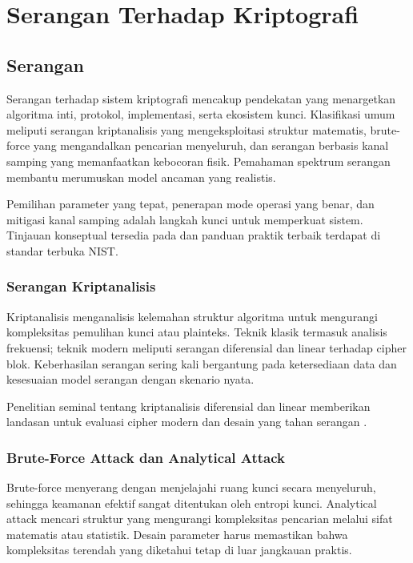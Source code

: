 \documentclass[../main.tex]{subfiles}
\begin{document}
\chapter{Serangan Terhadap Kriptografi}

\section{Serangan}
Serangan terhadap sistem kriptografi mencakup pendekatan yang menargetkan algoritma inti, protokol, implementasi, serta ekosistem kunci. Klasifikasi umum meliputi serangan kriptanalisis yang mengeksploitasi struktur matematis, brute-force yang mengandalkan pencarian menyeluruh, dan serangan berbasis kanal samping yang memanfaatkan kebocoran fisik. Pemahaman spektrum serangan membantu merumuskan model ancaman yang realistis.

Pemilihan parameter yang tepat, penerapan mode operasi yang benar, dan mitigasi kanal samping adalah langkah kunci untuk memperkuat sistem. Tinjauan konseptual tersedia pada \textcite{menezes1996handbook} dan panduan praktik terbaik terdapat di standar terbuka NIST.

\subsection{Serangan Kriptanalisis}
Kriptanalisis menganalisis kelemahan struktur algoritma untuk mengurangi kompleksitas pemulihan kunci atau plainteks. Teknik klasik termasuk analisis frekuensi; teknik modern meliputi serangan diferensial dan linear terhadap cipher blok. Keberhasilan serangan sering kali bergantung pada ketersediaan data dan kesesuaian model serangan dengan skenario nyata.

Penelitian seminal tentang kriptanalisis diferensial dan linear memberikan landasan untuk evaluasi cipher modern dan desain yang tahan serangan \parencite{biham1991differential,matsui1993linear}.

\subsection{Brute-Force Attack dan Analytical Attack}
Brute-force menyerang dengan menjelajahi ruang kunci secara menyeluruh, sehingga keamanan efektif sangat ditentukan oleh entropi kunci. Analytical attack mencari struktur yang mengurangi kompleksitas pencarian melalui sifat matematis atau statistik. Desain parameter harus memastikan bahwa kompleksitas terendah yang diketahui tetap di luar jangkauan praktis.
\end{document}
